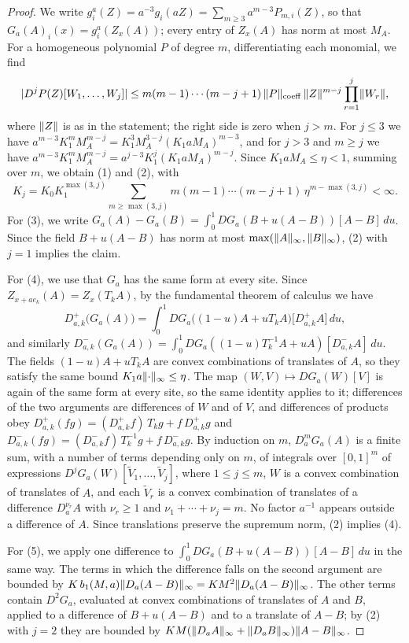 \begin{proof}
We write $g_i^a(Z)=a^{-3}g_i(aZ)=\sum_{m\ge3}a^{m-3}P_{m,i}(Z)$, so that $G_a(A)_i(x)=g_i^a(Z_x(A))$; every entry of $Z_x(A)$ has norm at most $M_A$. For a homogeneous polynomial $P$ of degree $m$, differentiating each monomial, we find
\[
 \lvert D^jP(Z)[W_1,\ldots,W_j]\rvert\le m(m-1)\cdots(m-j+1)\,\lVert P\rVert_{\mathrm{coeff}}\,\lVert Z\rVert^{m-j}\prod_{r=1}^j\lVert W_r\rVert,
\]
where $\lVert Z\rVert$ is as in the statement; the right side is zero when $j>m$. For $j\le3$ we have $a^{m-3}K_1^mM_A^{m-j}=K_1^3M_A^{3-j}(K_1aM_A)^{m-3}$, and for $j>3$ and $m\ge j$ we have $a^{m-3}K_1^mM_A^{m-j}=a^{j-3}K_1^j(K_1aM_A)^{m-j}$. Since $K_1aM_A\le\eta<1$, summing over $m$, we obtain (1) and (2), with
\[
 K_j=K_0K_1^{\max(3,j)}\sum_{m\ge\max(3,j)}m(m-1)\cdots(m-j+1)\,\eta^{m-\max(3,j)}<\infty .
\]
For (3), we write $G_a(A)-G_a(B)=\int_0^1DG_a(B+u(A-B))[A-B]\,du$. Since the field $B+u(A-B)$ has norm at most $\max(\lVert A\rVert_\infty,\lVert B\rVert_\infty)$, (2) with $j=1$ implies the claim.

For (4), we use that $G_a$ has the same form at every site. Since $Z_{x+ae_k}(A)=Z_x(T_kA)$, by the fundamental theorem of calculus we have
\[
 D^+_{a,k}\bigl(G_a(A)\bigr)=\int_0^1DG_a\bigl((1-u)A+uT_kA\bigr)\bigl[D^+_{a,k}A\bigr]\,du,
\]
and similarly $D^-_{a,k}(G_a(A))=\int_0^1DG_a((1-u)T_k^{-1}A+uA)[D^-_{a,k}A]\,du$. The fields $(1-u)A+uT_kA$ are convex combinations of translates of $A$, so they satisfy the same bound $K_1a\lVert \cdot\rVert_\infty\le\eta$. The map $(W,V)\mapsto DG_a(W)[V]$ is again of the same form at every site, so the same identity applies to it; differences of the two arguments are differences of $W$ and of $V$, and differences of products obey $D^+_{a,k}(fg)=(D^+_{a,k}f)\,T_kg+f\,D^+_{a,k}g$ and $D^-_{a,k}(fg)=(D^-_{a,k}f)\,T_k^{-1}g+f\,D^-_{a,k}g$. By induction on $m$, $D_a^mG_a(A)$ is a finite sum, with a number of terms depending only on $m$, of integrals over $[0,1]^m$ of expressions $D^jG_a(W)[\widetilde V_1,\ldots,\widetilde V_j]$, where $1\le j\le m$, $W$ is a convex combination of translates of $A$, and each $\widetilde V_r$ is a convex combination of translates of a difference $D_a^{\nu_r}A$ with $\nu_r\ge1$ and $\nu_1+\cdots+\nu_j=m$. No factor $a^{-1}$ appears outside a difference of $A$. Since translations preserve the supremum norm, (2) implies (4).

For (5), we apply one difference to $\int_0^1DG_a(B+u(A-B))[A-B]\,du$ in the same way. The terms in which the difference falls on the second argument are bounded by $K\,b_1(M,a)\lVert D_a(A-B)\rVert_\infty=KM^2\lVert D_a(A-B)\rVert_\infty$. The other terms contain $D^2G_a$, evaluated at convex combinations of translates of $A$ and $B$, applied to a difference of $B+u(A-B)$ and to a translate of $A-B$; by (2) with $j=2$ they are bounded by $KM(\lVert D_aA\rVert_\infty+\lVert D_aB\rVert_\infty)\lVert A-B\rVert_\infty$.
\end{proof}

